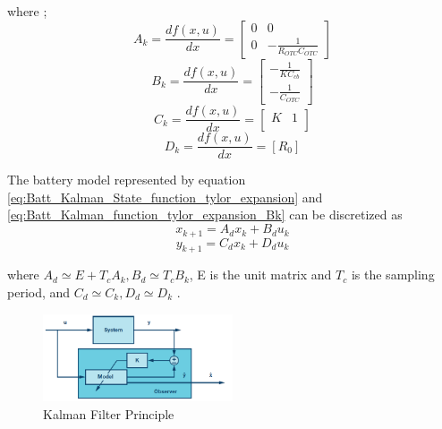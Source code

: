 where ;
\begin{equation}\label{eq:Batt_Kalman_function_tylor_expansion_Ak}
    A_k = \frac{d f(x,u)}{d x} =  \begin{bmatrix}
                                        0 & 0 \\
                                        0 & -\frac{1}{R_{OTC} C_{OTC}} 
                                  \end{bmatrix}                          
\end{equation}
\begin{equation}\label{eq:Batt_Kalman_function_tylor_expansion_Bk}
    B_k = \frac{d f(x,u)}{d x} =  \begin{bmatrix}
                                        -\frac{1}{K C_{cb}} \\
                                         -\frac{1}{ C_{OTC}} 
                                  \end{bmatrix}                          
\end{equation}
\begin{equation}\label{eq:Batt_Kalman_function_tylor_expansion_Ck}
    C_k = \frac{d f(x,u)}{d x} =  \begin{bmatrix}
                                    K & 1\\  
                                  \end{bmatrix}                          
\end{equation}
\begin{equation}\label{eq:Batt_Kalman_function_tylor_expansion_Dk}
    D_k = \frac{d f(x,u)}{d x} =  [R_0]                         
\end{equation}

The battery model represented by equation \ref{eq:Batt_Kalman_State_function_tylor_expansion} and \ref{eq:Batt_Kalman_function_tylor_expansion_Bk} can be discretized as
\begin{equation}\label{eq:Batt_Kalman_State_Prediction}
    x_{k+1} = A_d x_k + B_d u_k 
\end{equation}
\begin{equation}\label{eq:Batt_Kalman_Output_Prediction}
    y_{k+1} = C_d x_k + D_d u_k
\end{equation}

where $A_d \simeq  E + T_c A_k, B_d \simeq  T_c B_k$, E is the unit matrix and $T_c$ is the sampling 
period, and $C_d \simeq  C_k, D_d \simeq  D_k$ . 
\begin{figure}
    \centering
    \includegraphics[width=0.5\textwidth]{Chap07/Figures/Kalman_principle.PNG}
    \caption{Kalman Filter Principle}
    \label{fig:Kalman_Filter_Principle}
\end{figure}
